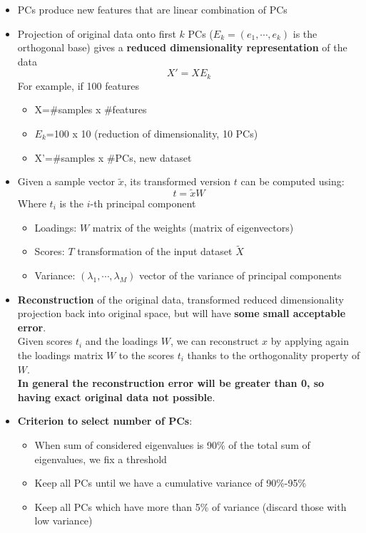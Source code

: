 \begin{itemize}
        \item PCs produce new features that are linear combination of PCs
        \item Projection of original data onto first $k$ PCs ($E_k=(e_1,\cdots,e_k)$ is the orthogonal base) gives a \textbf{reduced dimensionality representation} of the data
        $$X'=XE_k$$
        For example, if 100 features
        \begin{itemize}
            \item X=\#samples x \#features
            \item $E_k$=100 x 10 (reduction of dimensionality, 10 PCs)
            \item X'=\#samples x \#PCs, new dataset
        \end{itemize}
        \item Given a sample vector $\tilde{x}$, its transformed version $t$ can be computed using:
        $$t=\tilde{x}W$$
        Where $t_i$ is the $i$-th principal component
        \begin{itemize}
            \item Loadings: $W$ matrix of the weights (matrix of eigenvectors)
            \item Scores: $T$ transformation of the input dataset $\tilde{X}$
            \item Variance: $(\lambda_1,\cdots,\lambda_M)$ vector of the variance of principal components
        \end{itemize}
        \item \textbf{Reconstruction} of the original data, transformed reduced dimensionality projection back into original space, but will have \textbf{some small acceptable error}.\\
        Given scores $t_i$ and the loadings $W$, we can reconstruct $x$ by applying again the loadings matrix $W$ to the scores $t_i$ thanks to the orthogonality property of $W$.\\
        \textbf{In general the reconstruction error will be greater than 0, so having exact original data not possible}.
        \item \textbf{Criterion to select number of PCs}:
        \begin{itemize}
            \item When sum of considered eigenvalues is 90\% of the total sum of eigenvalues, we fix a threshold
            \item Keep all PCs until we have a cumulative variance of 90\%-95\%
            \item Keep all PCs which have more than 5\% of variance (discard those with low variance)

\end{itemize}
\end{itemize}
